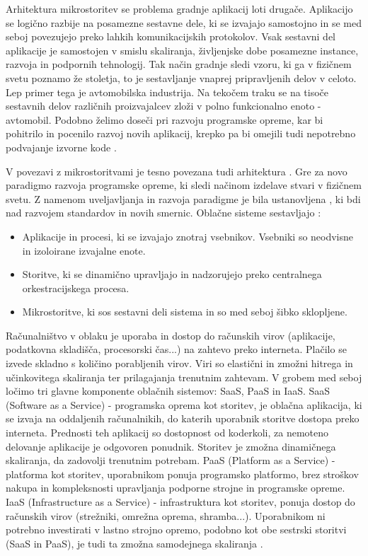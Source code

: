 \documentclass[a4paper, 12pt]{book}
\begin{document}
Arhitektura mikrostoritev se problema gradnje aplikacij loti drugače.
Aplikacijo se logično razbije na posamezne sestavne dele, ki se izvajajo samostojno in se med seboj povezujejo preko lahkih komunikacijskih protokolov.
Vsak sestavni del aplikacije je samostojen v smislu skaliranja, življenjske dobe posamezne instance, razvoja in podpornih tehnologij.
Tak način gradnje sledi vzoru, ki ga v fizičnem svetu poznamo že stoletja, to je sestavljanje vnaprej pripravljenih delov v celoto.
Lep primer tega je avtomobilska industrija.
Na tekočem traku se na tisoče sestavnih delov različnih proizvajalcev zloži v polno funkcionalno enoto - avtomobil.
Podobno želimo doseči pri razvoju programske opreme, kar bi pohitrilo in pocenilo razvoj novih aplikacij, krepko pa bi omejili tudi nepotrebno podvajanje izvorne kode \cite{microservicePattern, microservicesMartin}.

V povezavi z mikrostoritvami je tesno povezana tudi arhitektura .
Gre za novo paradigmo razvoja programske opreme, ki sledi načinom izdelave stvari v fizičnem svetu.
Z namenom uveljavljanja in razvoja paradigme je bila ustanovljena , ki bdi nad razvojem standardov in novih smernic.
Oblačne sisteme sestavljajo \cite{cncf}:
\begin{itemize}
	\item Aplikacije in procesi, ki se izvajajo znotraj vsebnikov. Vsebniki so neodvisne in izoloirane izvajalne enote.
	\item Storitve, ki se dinamično upravljajo in nadzorujejo preko centralnega orkestracijskega procesa.
	\item Mikrostoritve, ki sos sestavni deli sistema in so med seboj šibko sklopljene.
\end{itemize}

Računalništvo v oblaku je uporaba in dostop do računskih virov (aplikacije, podatkovna skladišča, procesorski čas...) na zahtevo preko interneta.
Plačilo se izvede skladno s količino porabljenih virov.
Viri so elastični in zmožni hitrega in učinkovitega skaliranja ter prilagajanja trenutnim zahtevam.
V grobem med seboj ločimo tri glavne komponente oblačnih sistemov: SaaS, PaaS in IaaS.
SaaS (Software as a Service) - programska oprema kot storitev, je oblačna aplikacija, ki se izvaja na oddaljenih računalnikih, do katerih uporabnik storitve dostopa preko interneta. 
Prednosti teh aplikacij so dostopnost od koderkoli, za nemoteno delovanje aplikacije je odgovoren ponudnik.
Storitev je zmožna dinamičnega skaliranja, da zadovolji trenutnim potrebam.
PaaS (Platform as a Service) - platforma kot storitev, uporabnikom ponuja programsko platformo, brez stroškov nakupa in kompleksnosti upravljanja podporne strojne in programske opreme.
IaaS (Infrastructure as a Service) - infrastruktura kot storitev, ponuja dostop do računskih virov (strežniki, omrežna oprema, shramba...).
Uporabnikom ni potrebno investirati v lastno strojno opremo, podobno kot obe sestrski storitvi (SaaS in PaaS), je tudi ta zmožna samodejnega skaliranja \cite{ibmCloudComputing}.
\end{document}
